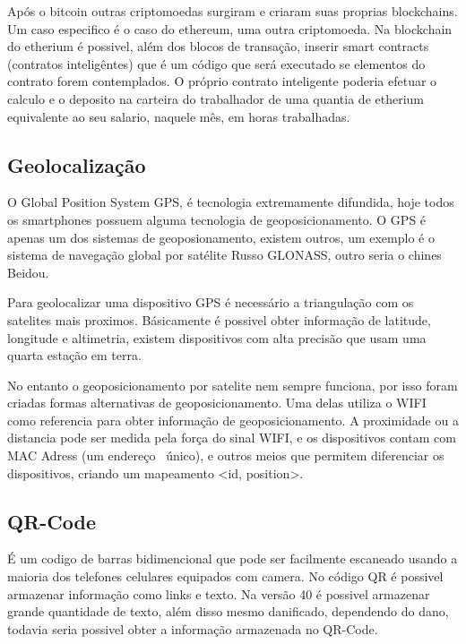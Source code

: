 \documentclass[12pt,openright,twoside,a4paper,english, brazil]{abntex2} %
\begin{document}
Após o bitcoin outras criptomoedas surgiram e criaram suas proprias blockchains. Um caso especifico é o caso do ethereum, uma outra criptomoeda. Na blockchain do etherium é possivel, além dos blocos de transação, inserir smart contracts (contratos inteligêntes) que é um código que será executado se elementos do contrato forem contemplados. O próprio contrato inteligente poderia efetuar o calculo e o deposito na carteira do trabalhador de uma quantia de etherium equivalente ao seu salario, naquele mês, em horas trabalhadas.

\subsection{Geolocalização}

O Global Position System \gls{GPS}, é tecnologia extremamente difundida, hoje todos os smartphones possuem alguma tecnologia de geoposicionamento. O \gls{GPS} é apenas um dos sistemas de geoposionamento, existem outros, um exemplo é o sistema de navegação global por satélite Russo \gls{GLONASS}, outro seria o chines \gls{Beidou}.

Para geolocalizar uma dispositivo \gls{GPS} é necessário a triangulação com os satelites mais proximos. Básicamente é possivel obter informação de latitude, longitude e altimetria, existem dispositivos com alta precisão que usam uma quarta estação em terra.

No entanto o geoposicionamento por satelite nem sempre funciona, por isso foram criadas formas alternativas de geoposicionamento. Uma delas utiliza o \gls{WIFI} como referencia para obter informação de geoposicionamento. A proximidade ou a distancia pode ser medida pela força do sinal WIFI, e os dispositivos contam com MAC Adress (um endereço  único), e outros meios que permitem diferenciar os dispositivos, criando um mapeamento <id, position>.



\subsection{QR-Code}

É um codigo de barras bidimencional que pode ser facilmente escaneado usando a maioria dos telefones celulares equipados com camera. No código QR é possivel armazenar informação como links e texto. Na versão 40 é possivel armazenar grande quantidade de texto, além disso mesmo danificado, dependendo do dano, todavia seria possivel obter a informação armazenada no QR-Code.
\end{document}
